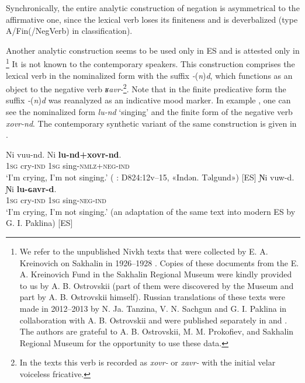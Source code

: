 \documentclass[output=paper,colorlinks,citecolor=brown]{langscibook}
\begin{document}
Synchronically, the entire analytic construction of negation is asymmetrical to the affirmative one, since the lexical verb loses its finiteness and is deverbalized (type A/Fin(/NegVerb) in  classification).

Another analytic construction seems to be used only in ES and is attested only in \citet{KreinovichMs}\footnote{We refer to the unpublished Nivkh texts that were collected by E. A. Kreinovich on Sakhalin in 1926–1928 \citep{KreinovichMs}. Copies of these documents from the E. A. Kreinovich Fund in the Sakhalin Regional Museum were kindly provided to us by A. B. Ostrovskii (part of them were discovered by the Museum and part by A. B. Ostrovskii himself). Russian translations of these texts were made in 2012–2013 by N. Ja. Tanzina, V. N. Sachgun and G. I. Paklina in collaboration with A. B. Ostrovskii and were published separately in \citet{Ostrovskii2016} and \citet{Kreinovich2016}. The authors are grateful to A. B. Ostrovskii, M. M. Prokofiev, and Sakhalin Regional Museum for the opportunity to use these data.} It is not known to the contemporary speakers. This construction comprises the lexical verb in the nominalized form with the suffix \textit{-}(\textit{n})\textit{d}, which functions as an object to the negative verb \textit{ʁavr{}-}\footnote{In the texts this verb is recorded as \textit{xovr-} or \textit{xavr-} with the initial velar voiceless fricative.}. Note that in the finite predicative form the suffix \textit{-}(\textit{n})\textit{d} was reanalyzed as an indicative mood marker.
In example , one can see the nominalized form \textit{lu-nd} ‘singing’ and the finite form of the negative verb \textit{xovr-nd}. The contemporary synthetic variant of the same construction is given in .

\ea\label{ex:niv:14}
    \ea\label{ex:niv:14a}
        \gll  Ni vuu-nd. Ni \textbf{lu-nd+xovr-nd}.\\ 
             \textsc{1sg} cry-\textsc{ind} \textsc{1sg} sing-\textsc{nmlz+neg-ind} \\
        \glt ‘I’m crying, I’m not singing.’ (\citealt{KreinovichMs} : D824:12v–15, «Indən. Təlgund») [ES]
    \ex\label{ex:niv:14b}
        \gll  Ɲi vuw-d. Ɲi \textbf{lu-ɢavr-d}. \\
             \textsc{1sg} cry-\textsc{ind} \textsc{1sg} sing-\textsc{neg-ind} \\
        \glt ‘I’m crying, I’m not singing.’ (an adaptation of the same text into modern ES by G. I. Paklina) [ES]
    \z
\z
\end{document}
